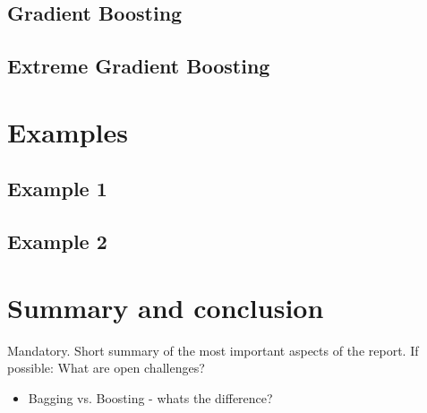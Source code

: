 \subsection{Gradient Boosting}

\subsection{Extreme Gradient Boosting}


\section{Examples}
\subsection{Example 1}
\subsection{Example 2}

\section{Summary and conclusion}
Mandatory. Short summary of the most important aspects of the report.
If possible: What are open challenges?

\begin{itemize}
    \item Bagging vs. Boosting - whats the difference?
\end{itemize}


